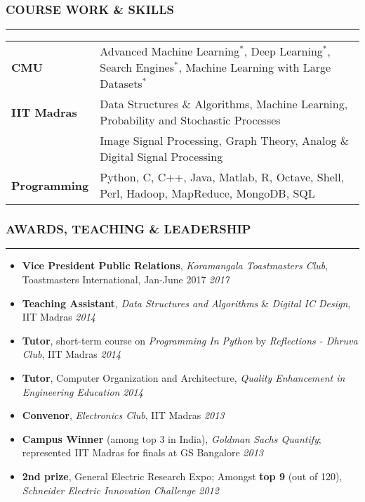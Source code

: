 \documentclass[10pt,a4paper,English]{article}
\newcommand\roottitle[1]{\vspace{-4mm}\subsubsection*{\uppercase{#1}}\vspace{-0.3em}\nopagebreak[4]\hrule\vspace{4mm}}
\newcommand\itemyear[1]{\hfill \emph{\color{itemyear} #1}}
\newcommand\itemenv{\setlength\itemsep{0.5pt} \addtolength{\itemindent}{-5mm}\vspace{-1.5mm}}
\begin{document}
\roottitle{Course Work \& Skills}
\vspace{-2mm}
\renewcommand{\arraystretch}{1.2}
\setlength\tabcolsep{0pt}
\begin{tabularx}{\textwidth}{ l @{ - } X }
\textbf{CMU}                        & Advanced Machine Learning$^*$, Deep Learning$^*$, Search Engines$^*$, Machine Learning with Large Datasets$^*$ \\
\textbf{IIT Madras}                 & Data Structures \& Algorithms, Machine Learning, Probability and Stochastic Processes \\
                                    & Image Signal Processing, Graph Theory, Analog \& Digital Signal Processing \\
\textbf{Programming}                & Python, C, C++, Java, Matlab, R, Octave, Shell, Perl, Hadoop, MapReduce, MongoDB, SQL \\
\end{tabularx}
\vspace{2mm}

\roottitle{Awards, Teaching \& Leadership}
\begin{itemize} \itemenv
    \item \textbf{Vice President Public Relations}, \textit{Koramangala Toastmasters Club}, Toastmasters International, Jan-June 2017 \itemyear{2017}
    \item \textbf{Teaching Assistant}, \textit{Data Structures and Algorithms} \& \textit{Digital IC Design}, IIT Madras \itemyear{2014}
    \item \textbf{Tutor}, short-term course on \textit{Programming In Python} by \emph{Reflections - Dhruva Club}, IIT Madras \itemyear{2014}
    \item \textbf{Tutor}, Computer Organization and Architecture, \emph{Quality Enhancement in Engineering Education} \itemyear{2014}
    \item \textbf{Convenor}, \textit{Electronics Club}, IIT Madras \itemyear{2013}
    \item \textbf{Campus Winner} (among top {3} in India), \textit{Goldman Sachs Quantify}; represented IIT Madras for finals at GS Bangalore \itemyear{2013}
    \item \textbf{2nd prize}, General Electric Research Expo; Amongst \textbf{top 9} (out of 120), \textit{Schneider Electric Innovation Challenge} \itemyear{2012}
\end{itemize}
\vspace{1mm}

\noindent {}
\end{document}
